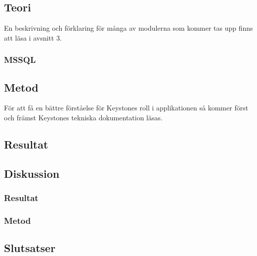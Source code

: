 \subsection{Teori}
En beskrivning och förklaring för många av modulerna som kommer tas upp finns att läsa i avsnitt 3.
\subsubsection{MSSQL}


\subsection{Metod}
För att få en bättre förståelse för Keystones roll i applikationen så kommer först och främst Keystones tekniska dokumentation läsas. 
\subsection{Resultat}
\subsection{Diskussion}
\subsubsection{Resultat}
\subsubsection{Metod}
\subsection{Slutsatser}

